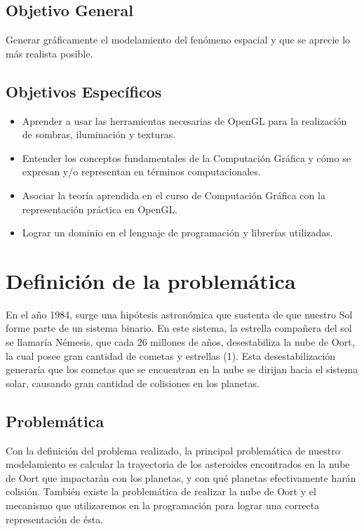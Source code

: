 \documentclass[journal]{IEEEtran}
\begin{document}
\subsection{Objetivo General}
	Generar gráficamente el modelamiento del fenómeno espacial y que se aprecie lo más realista posible. 

\subsection{Objetivos Específicos}
	\begin{itemize}
		\item Aprender a usar las herramientas necesarias de OpenGL para la realización de sombras, iluminación 
		y texturas.
		\item Entender los conceptos fundamentales de la Computación Gráfica y cómo se expresan y/o representan 
		en términos computacionales.
		\item Asociar la teoría aprendida en el curso de Computación Gráfica con la 
		representación práctica en OpenGL.
		\item Lograr un dominio en el lenguaje  de programación y librerías utilizadas.	
	\end{itemize}
	
\section{Definición de la problemática}

En el año 1984, surge una hipótesis astronómica que sustenta de que nuestro Sol forme parte de un sistema binario. En este sistema, la estrella compañera del sol se llamaría Némesis, que cada 26 millones de años, desestabiliza la nube de Oort, la cual posee gran cantidad de cometas y estrellas (1). Esta desestabilización generaría que los cometas que se encuentran en la nube se dirijan hacia el sistema solar, causando gran cantidad de colisiones en los planetas.

\subsection{Problemática}

Con la definición del problema realizado, la principal problemática de nuestro modelamiento es calcular la trayectoria de los asteroides encontrados en la nube de Oort que impactarán con los planetas, y con qué planetas efectivamente harán colisión. También existe la problemática de realizar la nube de Oort y el mecanismo que utilizaremos en la programación para lograr una correcta representación de ésta. 
\end{document}
